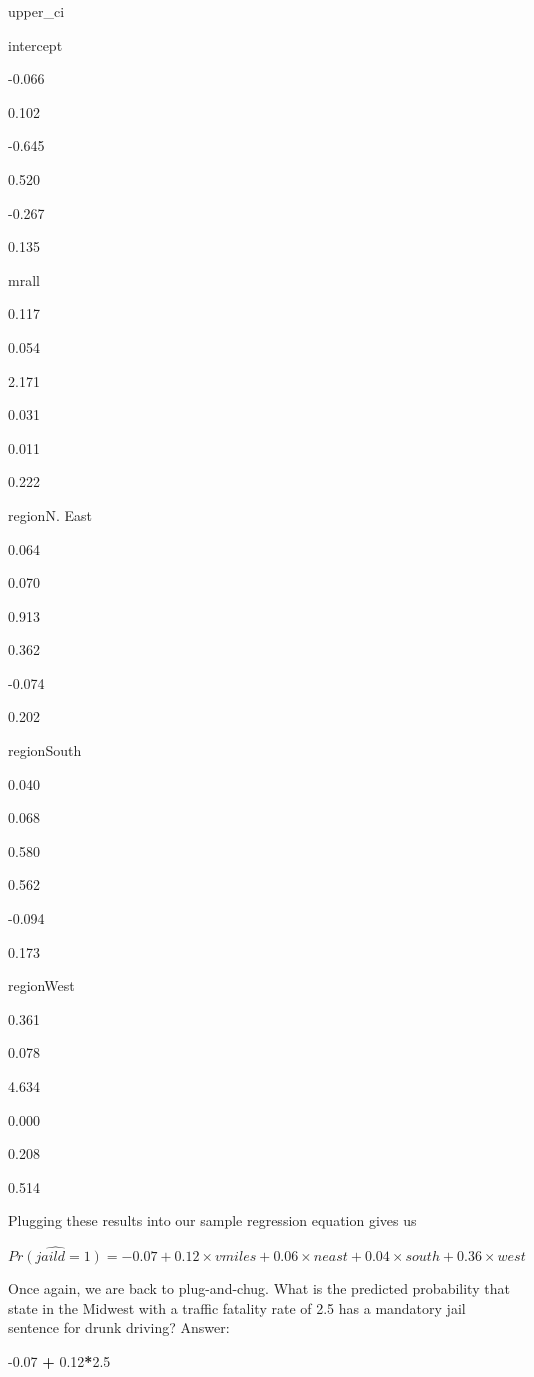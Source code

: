 \documentclass[
]{book}
\newenvironment{Shaded}{\begin{snugshade}}{\end{snugshade}}
\newcommand{\FloatTok}[1]{\textcolor[rgb]{0.00,0.00,0.81}{#1}}
\newcommand{\OperatorTok}[1]{\textcolor[rgb]{0.81,0.36,0.00}{\textbf{#1}}}
\newcommand{\StringTok}[1]{\textcolor[rgb]{0.31,0.60,0.02}{#1}}
\begin{document}
upper\_ci

intercept

-0.066

0.102

-0.645

0.520

-0.267

0.135

mrall

0.117

0.054

2.171

0.031

0.011

0.222

regionN. East

0.064

0.070

0.913

0.362

-0.074

0.202

regionSouth

0.040

0.068

0.580

0.562

-0.094

0.173

regionWest

0.361

0.078

4.634

0.000

0.208

0.514

Plugging these results into our sample regression equation gives us

\begin{equation}
\hat{Pr(jaild=1)}= -0.07 + 0.12 \times vmiles + 0.06 \times neast + 0.04 \times south + 0.36 \times west
\label{eq:lpmexsample}
\end{equation}

Once again, we are back to plug-and-chug. What is the predicted probability that state in the Midwest with a traffic fatality rate of 2.5 has a mandatory jail sentence for drunk driving? Answer:

\begin{Shaded}
\begin{Highlighting}[]
\FloatTok{-0.07} \OperatorTok{+}\StringTok{ }\FloatTok{0.12}\OperatorTok{*}\FloatTok{2.5}
\end{Highlighting}
\end{Shaded}
\end{document}
